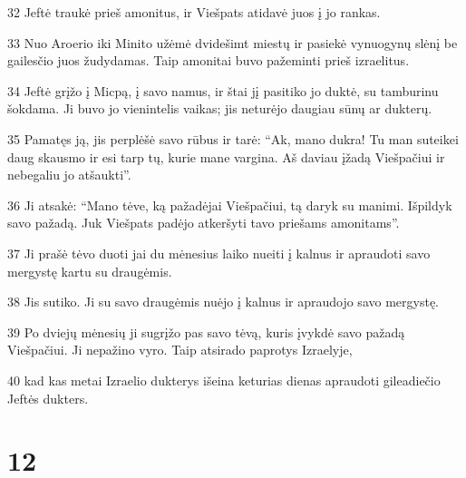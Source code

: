 \par 32 Jeftė traukė prieš amonitus, ir Viešpats atidavė juos į jo rankas. 
\par 33 Nuo Aroerio iki Minito užėmė dvidešimt miestų ir pasiekė vynuogynų slėnį be gailesčio juos žudydamas. Taip amonitai buvo pažeminti prieš izraelitus. 
\par 34 Jeftė grįžo į Micpą, į savo namus, ir štai jį pasitiko jo duktė, su tamburinu šokdama. Ji buvo jo vienintelis vaikas; jis neturėjo daugiau sūnų ar dukterų. 
\par 35 Pamatęs ją, jis perplėšė savo rūbus ir tarė: “Ak, mano dukra! Tu man suteikei daug skausmo ir esi tarp tų, kurie mane vargina. Aš daviau įžadą Viešpačiui ir nebegaliu jo atšaukti”. 
\par 36 Ji atsakė: “Mano tėve, ką pažadėjai Viešpačiui, tą daryk su manimi. Išpildyk savo pažadą. Juk Viešpats padėjo atkeršyti tavo priešams amonitams”. 
\par 37 Ji prašė tėvo duoti jai du mėnesius laiko nueiti į kalnus ir apraudoti savo mergystę kartu su draugėmis. 
\par 38 Jis sutiko. Ji su savo draugėmis nuėjo į kalnus ir apraudojo savo mergystę. 
\par 39 Po dviejų mėnesių ji sugrįžo pas savo tėvą, kuris įvykdė savo pažadą Viešpačiui. Ji nepažino vyro. Taip atsirado paprotys Izraelyje, 
\par 40 kad kas metai Izraelio dukterys išeina keturias dienas apraudoti gileadiečio Jeftės dukters.



\chapter{12}


